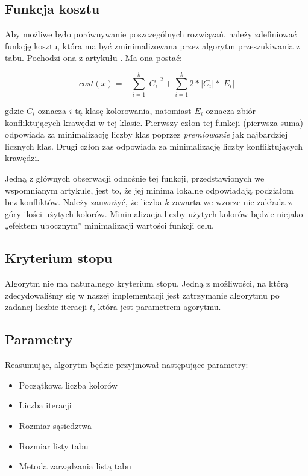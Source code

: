 \documentclass[12pt,a4paper]{article}
\begin{document}
\subsection{Funkcja kosztu}
Aby możliwe było porównywanie poszczególnych rozwiązań, należy zdefiniować funkcję kosztu, która ma być zminimalizowana przez algorytm przeszukiwania z tabu. Pochodzi ona z artykułu \cite{coloring}. Ma ona postać:

\begin{equation}
cost(x) = - \sum_{i=1}^{k}|C_i|^2 + \sum_{i=1}^{k} 2*|C_i|*|E_i|
\end{equation}

gdzie $C_i$ oznacza $i$-tą klasę kolorowania, natomiast $E_i$ oznacza zbiór konfliktujących krawędzi w tej klasie. Pierwszy człon tej funkcji (pierwsza suma) odpowiada za minimalizację liczby klas poprzez \textit{premiowanie} jak najbardziej licznych klas. Drugi człon zas odpowiada za minimalizację liczby konfliktujących krawędzi.


Jedną z głównych obserwacji odnośnie tej funkcji, przedstawionych we wspomnianym artykule, jest to, że jej
minima lokalne odpowiadają podziałom bez konfliktów. Należy zauważyć, że liczba $k$ zawarta we
wzorze nie zakłada z góry ilości użytych kolorów. Minimalizacja liczby użytych kolorów będzie niejako
„efektem ubocznym” minimalizacji wartości funkcji celu.


\subsection{Kryterium stopu}
Algorytm nie ma naturalnego kryterium stopu. Jedną z możliwości, na którą zdecydowaliśmy się w naszej implementacji jest zatrzymanie algorytmu po zadanej liczbie iteracji $t$, która jest parametrem agorytmu.

\subsection{Parametry}
Reasumując, algorytm będzie przyjmował następujące parametry:
\begin{itemize}
\item Początkowa liczba kolorów
\item Liczba iteracji
\item Rozmiar sąsiedztwa
\item Rozmiar listy tabu
\item Metoda zarządzania listą tabu
\end{itemize}
\end{document}
